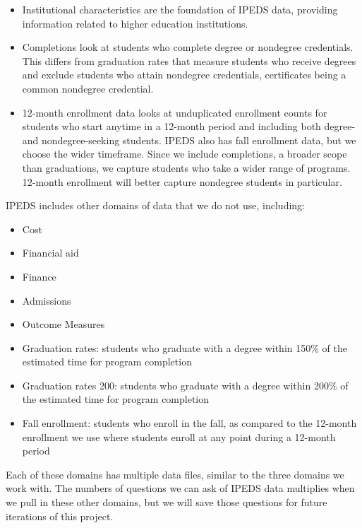 \documentclass[sigconf, authorversion, nonacm]{acmart}
\begin{document}
        \begin{itemize}
            \item Institutional characteristics are the foundation of IPEDS data, providing information related to higher education institutions.
            \item Completions look at students who complete degree or nondegree credentials. This differs from graduation rates that measure students who receive degrees and exclude students who attain nondegree credentials, certificates being a common nondegree credential.
            \item 12-month enrollment data looks at unduplicated enrollment counts for students who start anytime in a 12-month period and including both degree- and nondegree-seeking students. IPEDS also has fall enrollment data, but we choose the wider timeframe. Since we include completions, a broader scope than graduations, we capture students who take a wider range of programs. 12-month enrollment will better capture nondegree students in particular.
        \end{itemize}

        IPEDS includes other domains of data that we do not use, including:

        \begin{itemize}
            \item Cost
            \item Financial aid
            \item Finance
            \item Admissions
            \item Outcome Measures
            \item Graduation rates: students who graduate with a degree within 150\% of the estimated time for program completion
            \item Graduation rates 200: students who graduate with a degree within 200\% of the estimated time for program completion
            \item Fall enrollment: students who enroll in the fall, as compared to the 12-month enrollment we use where students enroll at any point during a 12-month period
        \end{itemize}

        Each of these domains has multiple data files, similar to the three domains we work with. The numbers of questions we can ask of IPEDS data multiplies when we pull in these other domains, but we will save those questions for future iterations of this project.
\end{document}
